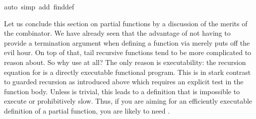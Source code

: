 \begin{isabellebody}
\isamarkupfalse%
auto\ simp\ add{\isacharcolon}\ find{}{\isacharunderscore}def{\isacharparenright}\isanewline
\isamarkupfalse%
\isamarkupfalse%
%
\begin{isamarkuptext}%
Let us conclude this section on partial functions by a
discussion of the merits of the  combinator. We have
already seen that the advantage of not having to
provide a termination argument when defining a function via  merely puts off the evil hour. On top of that, tail recursive
functions tend to be more complicated to reason about. So why use
 at all? The only reason is executability: the recursion
equation for  is a directly executable functional
program. This is in stark contrast to guarded recursion as introduced
above which requires an explicit test  in the
function body.  Unless  is trivial, this leads to a
definition that is impossible to execute or prohibitively slow.
Thus, if you are aiming for an efficiently executable definition
of a partial function, you are likely to need .%
\end{isamarkuptext}%
\isamarkuptrue%
\isanewline
\isamarkupfalse%
\end{isabellebody}%
